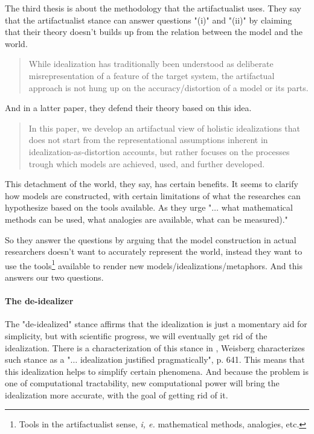 The third thesis is about the methodology that the artifactualist uses.
They say that the artifactualist stance can answer questions "(i)" and "(ii)" by claiming that their theory doesn't builds up from the relation between the model and the world.

\begin{quote}
	While idealization has traditionally been understood as deliberate misrepresentation of a feature of the target system, the artifactual  approach is not hung up on the accuracy/distortion of a model or its parts. \parencite[][p. 8]{Carrillo2021-CARAAP-12}
\end{quote}

And in a latter paper, they defend their theory based on this idea.

\begin{quote}
	In this paper, we develop an artifactual view of holistic idealizations that does not start from the representational assumptions inherent in idealization-as-distortion accounts, but rather focuses on the processes trough which models are achieved, used, and further developed. \parencite[][p. 50]{Carrillo2022}
\end{quote}

This detachment of the world, they say, has certain benefits.
It seems to clarify how models are constructed, with certain limitations of what the researches can hypothesize based on the tools available.
As they urge "$\ldots$ what  mathematical methods can be used, what analogies are available, what can be measured)." \parencite[][p. 9]{Carrillo2021-CARAAP-12}

So they answer the questions by arguing that the model construction in actual researchers doesn't want to accurately represent the world, instead they want to use the tools\footnote{Tools in the artifactualist sense, \emph{i, e.} mathematical methods, analogies, etc.} available to render new models/idealizations/metaphors.
And this answers our two questions.

\paragraph{The de-idealizer}

The "de-idealized" stance affirms that the idealization is just a momentary aid for simplicity, but with scientific progress, we will eventually get rid of the idealization.
There is a characterization of this stance in \parencite{Weisberg2007}, Weisberg characterizes such stance as a "$\ldots$ idealization justified pragmatically", p. 641.
This means that this idealization helps to simplify certain phenomena.
And because the problem is one of computational tractability, new computational power will bring the idealization more accurate, with the goal of getting rid of it.


